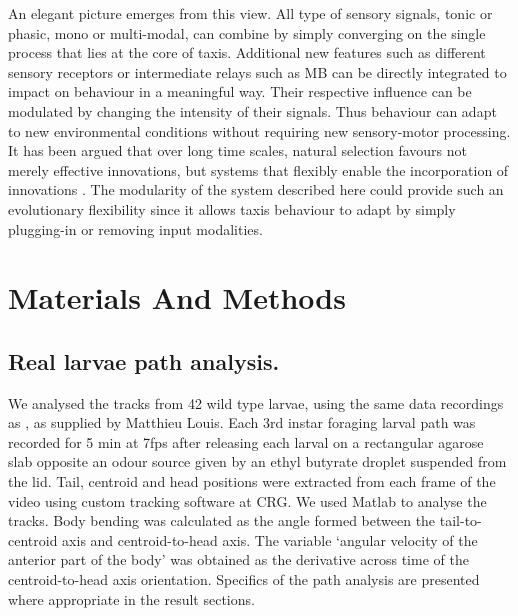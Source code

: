\documentclass[11pt,a4paper]{article}
\begin{document}
An elegant picture emerges from this view. All type of sensory signals, tonic or phasic, mono or multi-modal, can combine by simply converging on the single process that lies at the core of taxis. Additional new features such as different sensory receptors or intermediate relays such as MB can be directly integrated to impact on behaviour in a meaningful way. Their respective influence can be modulated by changing the intensity of their signals. Thus behaviour can adapt to new environmental conditions  without requiring new sensory-motor processing. It has been argued that over long time scales, natural selection favours not merely effective innovations, but systems that flexibly enable the incorporation of innovations \citep{vermeij1973adaptation}. The modularity of the system described here could provide such an evolutionary flexibility since it allows taxis behaviour to adapt by simply plugging-in or removing input modalities.


\section{Materials And Methods}
\subsection{Real larvae path analysis.}
We analysed the tracks from 42 wild type larvae, using the same data recordings as \cite{gomez2011active}, as supplied by Matthieu Louis. Each 3rd instar foraging larval path was recorded for 5 min at 7fps after releasing each larval on a rectangular agarose slab opposite an odour source given by an ethyl butyrate droplet suspended from the lid. Tail, centroid and head positions were extracted from each frame of the video using custom tracking software at CRG. We used Matlab to analyse the tracks. Body bending was calculated as the angle formed between the tail-to-centroid axis and centroid-to-head axis. The variable ‘angular velocity of the anterior part of the body’ was obtained as the derivative across time of the centroid-to-head axis orientation. Specifics of the path analysis are presented where appropriate in the result sections. 
\end{document}
